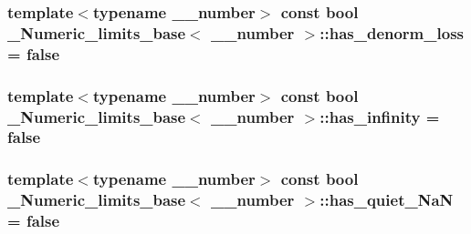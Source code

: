 \subsubsection[{has\+\_\+denorm\+\_\+loss}]{\setlength{\rightskip}{0pt plus 5cm}template$<$typename \+\_\+\+\_\+number$>$ const {\bf bool} {\bf \+\_\+\+Numeric\+\_\+limits\+\_\+base}$<$ \+\_\+\+\_\+number $>$\+::has\+\_\+denorm\+\_\+loss = {\bf false}\hspace{0.3cm}{\ttfamily [static]}}\label{class__Numeric__limits__base_a7bdcbb39f7870da9e300fceb0a38cb36}
\hypertarget{class__Numeric__limits__base_aaae027c5b3f7b882c1e1a03a955ed736}{}
\subsubsection[{has\+\_\+infinity}]{\setlength{\rightskip}{0pt plus 5cm}template$<$typename \+\_\+\+\_\+number$>$ const {\bf bool} {\bf \+\_\+\+Numeric\+\_\+limits\+\_\+base}$<$ \+\_\+\+\_\+number $>$\+::has\+\_\+infinity = {\bf false}\hspace{0.3cm}{\ttfamily [static]}}\label{class__Numeric__limits__base_aaae027c5b3f7b882c1e1a03a955ed736}
\hypertarget{class__Numeric__limits__base_a68eb436f33988d414059656bee941358}{}
\subsubsection[{has\+\_\+quiet\+\_\+\+Na\+N}]{\setlength{\rightskip}{0pt plus 5cm}template$<$typename \+\_\+\+\_\+number$>$ const {\bf bool} {\bf \+\_\+\+Numeric\+\_\+limits\+\_\+base}$<$ \+\_\+\+\_\+number $>$\+::has\+\_\+quiet\+\_\+\+Na\+N = {\bf false}\hspace{0.3cm}{\ttfamily [static]}}\label{class__Numeric__limits__base_a68eb436f33988d414059656bee941358}
\hypertarget{class__Numeric__limits__base_a48cb53c83c521d6c3afb3d6c6990bb00}{}
